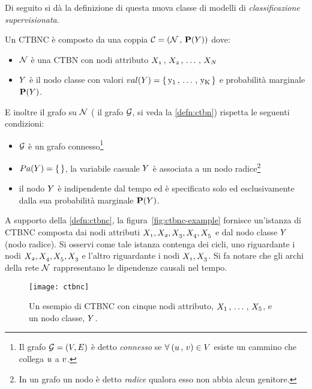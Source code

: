 Di seguito si dà la definizione di questa nuova classe di modelli di \emph{classificazione supervisionata}.
\begin{definizione}\label{defn:ctbnc}
Un \acf{CTBNC} è composto da una coppia $\mathcal{C}=(\mathcal{N}\,,\,\mathbf{P}(\mathnormal{Y}))$ dove:
\begin{itemize}
    \item $\mathcal{N}$ è una \acs{CTBN} con nodi attributo $\mathnormal{X_1}\,,\,\mathnormal{X_2}\,,\,\dotsc\,,\,\mathnormal{X_N}$
    \item $\mathnormal{Y}$ è il nodo classe con valori $val(\mathnormal{Y})=\{\,\mathrm{y_1}\,,\,\dotsc\,,\,\mathrm{y_K}\,\}$ e probabilità marginale $\mathbf{P}(\mathnormal{Y})$.
\end{itemize}
E inoltre il grafo su $\mathcal{N}$ (\ie{} il grafo $\mathcal{G}$, si veda la \autoref{defn:ctbn}) rispetta le seguenti condizioni:
\begin{itemize}
    \item $\mathcal{G}$ è un grafo connesso\footnote{Il grafo $\mathcal{G} = (\mathnormal{V}, \mathnormal{E})$ è detto \emph{connesso} se $\forall \: (\mathnormal{u}\,,\,\mathnormal{v}) \in \mathnormal{V}$ esiste un cammino che collega $\mathnormal{u}$ a $\mathnormal{v}$.}
    \item $Pa(\mathnormal{Y})=\{\,\}$, \ie{} la variabile casuale $\mathnormal{Y}$ è associata a un nodo radice\footnote{In un grafo un nodo è detto \emph{radice} qualora esso non abbia alcun genitore.}
    \item il nodo $\mathnormal{Y}$ è indipendente dal tempo ed è specificato solo ed esclusivamente dalla sua probabilità marginale $\mathbf{P}(\mathnormal{Y})$.
\end{itemize}
\end{definizione}
A supporto della \autoref{defn:ctbnc}, la figura~\vref{fig:ctbnc-example} fornisce un'istanza di \acs{CTBNC} composta dai nodi attributi $\mathnormal{X_1},\mathnormal{X_2},\mathnormal{X_3},\mathnormal{X_4},\mathnormal{X_5}$ e dal nodo classe $\mathnormal{Y}$ (nodo radice). Si osservi come tale istanza contenga dei cicli, uno riguardante i nodi $\mathnormal{X_2},\mathnormal{X_4},\mathnormal{X_5},\mathnormal{X_3}$ e l'altro riguardante i nodi $\mathnormal{X_1},\mathnormal{X_3}$. Si fa notare che gli archi della rete $\mathcal{N}$ rappresentano le dipendenze causali nel tempo.

\newpage

\begin{figure}
\centering
\texttt{[image: ctbnc]}
\caption[Un esempio di \acs{CTBNC}]{Un esempio di \acf{CTBNC} con cinque nodi attributo, $\mathnormal{X}_1\,,\,\dotsc\,,\,\mathnormal{X}_5$, e un nodo classe, $\mathnormal{Y}$.}
\label{fig:ctbnc-example}
\end{figure}

